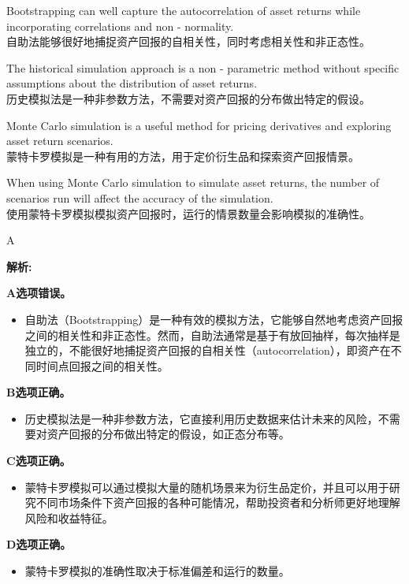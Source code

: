 \documentclass{article}
\newenvironment{explanation}
{\textbf{解析:}\par}
{\par}
\begin{document}
    \begin{choices}
        \item Bootstrapping can well capture the autocorrelation of asset returns while incorporating correlations and non - normality.\\
        自助法能够很好地捕捉资产回报的自相关性，同时考虑相关性和非正态性。
        \item The historical simulation approach is a non - parametric method without specific assumptions about the distribution of asset returns.\\
        历史模拟法是一种非参数方法，不需要对资产回报的分布做出特定的假设。
        \item Monte Carlo simulation is a useful method for pricing derivatives and exploring asset return scenarios.\\
        蒙特卡罗模拟是一种有用的方法，用于定价衍生品和探索资产回报情景。
        \item When using Monte Carlo simulation to simulate asset returns, the number of scenarios run will affect the accuracy of the simulation.\\
        使用蒙特卡罗模拟模拟资产回报时，运行的情景数量会影响模拟的准确性。
    \end{choices}
    
    \begin{correctanswer}
        A
    \end{correctanswer}
    
    \begin{explanation}
    \textbf{A选项错误。}
    \begin{itemize}
        \item 自助法（Bootstrapping）是一种有效的模拟方法，它能够自然地考虑资产回报之间的相关性和非正态性。然而，自助法通常是基于有放回抽样，每次抽样是独立的，不能很好地捕捉资产回报的自相关性（autocorrelation），即资产在不同时间点回报之间的相关性。
    \end{itemize}
    \textbf{B选项正确。}
    \begin{itemize}
        \item 历史模拟法是一种非参数方法，它直接利用历史数据来估计未来的风险，不需要对资产回报的分布做出特定的假设，如正态分布等。
    \end{itemize}
    \textbf{C选项正确。}
    \begin{itemize}
        \item 蒙特卡罗模拟可以通过模拟大量的随机场景来为衍生品定价，并且可以用于研究不同市场条件下资产回报的各种可能情况，帮助投资者和分析师更好地理解风险和收益特征。
    \end{itemize}
    \textbf{D选项正确。}
    \begin{itemize}
        \item 蒙特卡罗模拟的准确性取决于标准偏差和运行的数量。
    \end{itemize}
    \end{explanation}
    
\end{document}
